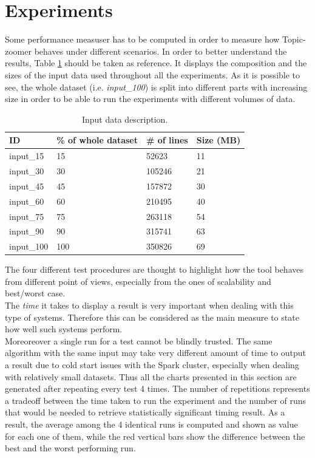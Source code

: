 \documentclass{sig-alternate-05-2015}
\begin{document}
\section{Experiments}\label{experiments}
Some performance measuser has to be computed in order to measure how Topic-zoomer behaves under different scenarios. In order to better understand the results, Table \ref{datasets} should be taken as reference. It displays the composition and the sizes of the input data used throughout all the experiments. As it is possible to see, the whole dataset (i.e. \emph{input\_100}) is split into different parts with increasing size in order to be able to run the experiments with different volumes of data.

\begin{table}[]
    \centering
    \caption{Input data description.}
    \label{datasets}
    \begin{tabular}{llll}
    \hline
    ID         & \% of whole dataset & \# of lines & Size (MB) \\
    \hline
    input\_15  & 15                  & 52623       & 11        \\
    input\_30  & 30                  & 105246      & 21        \\
    input\_45  & 45                  & 157872      & 30        \\
    input\_60  & 60                  & 210495      & 40        \\
    input\_75  & 75                  & 263118      & 54        \\
    input\_90  & 90                  & 315741      & 63        \\
    input\_100 & 100                 & 350826      & 69       
    \end{tabular}
\end{table}

The four different test procedures are thought to highlight how the tool behaves from different point of views, especially from the ones of scalability and best/worst case.\\
The \emph{time} it takes to display a result is very important when dealing with this type of systems. Therefore this can be considered as the main measure to state how well such systems perform.\\
Moreoreover a single run for a test cannot be blindly trusted. The same algorithm with the same input may take very different amount of time to output a result due to cold start issues with the Spark cluster, especially when dealing with relatively small datasets. Thus all the charts presented in this section are generated after repeating every test 4 times. The number of repetitions represents a tradeoff between the time taken to run the experiment and the number of runs that would be needed to retrieve statistically significant timing result. As a result, the average among the 4 identical runs is computed and shown as value for each one of them, while the red vertical bars show the difference between the best and the worst performing run.\\
\end{document}
